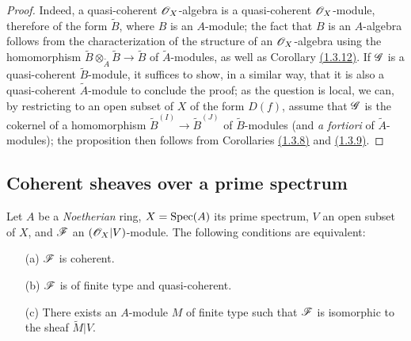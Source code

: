 \begin{proof}
\label{proof-cor-1.1.4.3}
Indeed, a quasi-coherent $\mathscr{O}_X$-algebra is a quasi-coherent $\mathscr{O}_X$-module, therefore of the
form $\widetilde{B}$, where $B$ is an $A$-module; the fact that $B$ is an $A$-algebra
follows from the characterization of the structure of an $\mathscr{O}_X$-algebra using the
homomorphism $\widetilde{B}\otimes_{\widetilde{A}}\widetilde{B}\to\widetilde{B}$ of
$\widetilde{A}$-modules, as well as Corollary \hyperref[cor-1.1.3.12]{(1.3.12)}. If $\mathscr{G}$ is a quasi-coherent
$\widetilde{B}$-module, it suffices to show, in a similar way,
that it is also a quasi-coherent $\widetilde{A}$-module to conclude the proof; as the
question is local, we can, by restricting to an open subset of $X$ of the form $D(f)$, assume
that $\mathscr{G}$ is the cokernel of a homomorphism $\widetilde{B}^{(I)}\to\widetilde{B}^{(J)}$
of $\widetilde{B}$-modules (and {\em a fortiori} of $\widetilde{A}$-modules); the
proposition then follows from Corollaries \hyperref[cor-1.1.3.8]{(1.3.8)} and \hyperref[cor-1.1.3.9]{(1.3.9)}.
\end{proof}

\subsection{Coherent sheaves over a prime spectrum}
\label{subsection-coh-over-spec}

\begin{thm}[1.5.1]
\label{thm-1.1.5.1}
Let $A$ be a {\em Noetherian} ring, $X={\mathop{\mathrm{Spec}}\nolimits}(A)$ its prime spectrum, $V$ an open subset of
$X$, and $\mathscr{F}$ an $(\mathscr{O}_X|V)$-module. The following conditions are equivalent:
\begin{itemize}
  \item[{\rm(a)}] $\mathscr{F}$ is coherent.
  \item[{\rm(b)}] $\mathscr{F}$ is of finite type and quasi-coherent.
  \item[{\rm(c)}] There exists an $A$-module $M$ of finite type such that $\mathscr{F}$ is isomorphic to
    the sheaf $\widetilde{M}|V$.
\end{itemize}
\end{thm}

